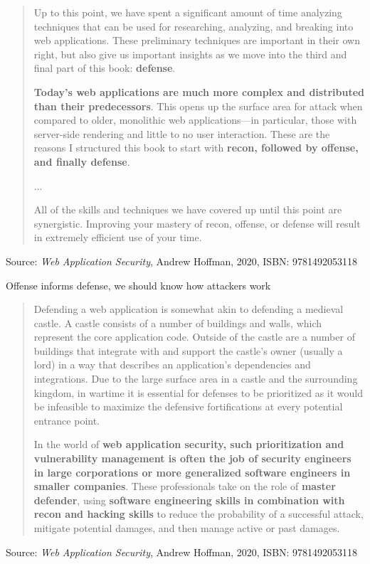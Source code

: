 \documentclass[Screen16to9,17pt]{foils}
\begin{document}
\begin{quote}\small
Up to this point, we have spent a significant amount of time analyzing techniques that can be used for researching, analyzing, and breaking into web applications. These preliminary techniques are important in their own right, but also give us important insights as we move into the third and final part of this book: {\bf defense}.

{\bf Today’s web applications are much more complex and distributed than their predecessors}. This opens up the surface area for attack when compared to older, monolithic web applications—in particular, those with server-side rendering and little to no user interaction. These are the reasons I structured this book to start with {\bf recon, followed by offense, and finally defense}.

...

All of the skills and techniques we have covered up until this point are synergistic.
Improving your mastery of recon, offense, or defense will result in extremely efficient
use of your time.
\end{quote}
Source: \emph{Web Application Security}, Andrew Hoffman, 2020, ISBN: 9781492053118

\begin{list2}
\item Offense informs defense, we should know how attackers work
\end{list2}




\begin{quote}\small
Defending a web application is somewhat akin to defending a medieval castle. A castle consists of a number of buildings and walls, which represent the core application code. Outside of the castle are a number of buildings that integrate with and support the castle’s owner (usually a lord) in a way that describes an application’s dependencies and integrations. Due to the large surface area in a castle and the surrounding kingdom, in wartime it is essential for defenses to be prioritized as it would be infeasible to maximize the defensive fortifications at every potential entrance point.

In the world of {\bf web application security, such prioritization and vulnerability management is often the job of security engineers in large corporations or more generalized software engineers in smaller companies}. These professionals take on the role of {\bf master defender}, using {\bf software engineering skills in combination with recon and hacking skills} to reduce the probability of a successful attack, mitigate potential damages, and then manage active or past damages.
\end{quote}
Source: \emph{Web Application Security}, Andrew Hoffman, 2020, ISBN: 9781492053118
\end{document}
